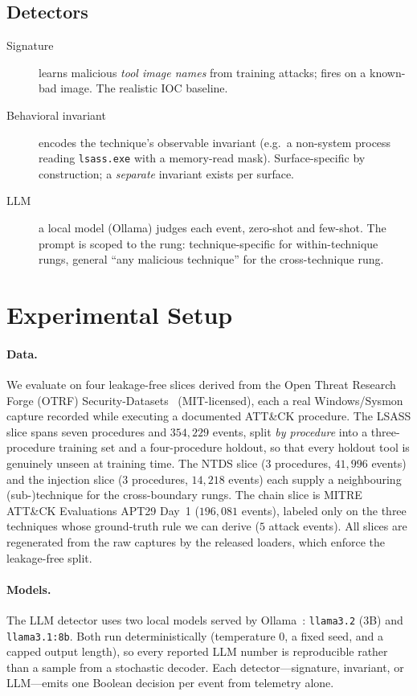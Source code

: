 \documentclass[sigconf,nonacm]{acmart}
\begin{document}
\subsection{Detectors}
\begin{description}
  \item[Signature] learns malicious \emph{tool image names} from training
  attacks; fires on a known-bad image. The realistic IOC baseline.
  \item[Behavioral invariant] encodes the technique's observable invariant
  (e.g.\ a non-system process reading \texttt{lsass.exe} with a memory-read
  mask). Surface-specific by construction; a \emph{separate} invariant exists
  per surface.
  \item[LLM] a local model (Ollama) judges each event, zero-shot and few-shot.
  The prompt is scoped to the rung: technique-specific for within-technique
  rungs, general ``any malicious technique'' for the cross-technique rung.
\end{description}

\section{Experimental Setup}
\label{sec:setup}

\paragraph{Data.}
We evaluate on four leakage-free slices derived from the Open Threat Research
Forge (OTRF) Security-Datasets~\cite{otrf} (MIT-licensed), each a real
Windows/Sysmon capture recorded while executing a documented ATT\&CK procedure.
The LSASS slice spans seven procedures and $354{,}229$ events, split
\emph{by procedure} into a three-procedure training set and a four-procedure
holdout, so that every holdout tool is genuinely unseen at training time. The
NTDS slice ($3$ procedures, $41{,}996$ events) and the injection slice
($3$ procedures, $14{,}218$ events) each supply a neighbouring (sub-)technique
for the cross-boundary rungs. The chain slice is MITRE ATT\&CK Evaluations APT29
Day~1 ($196{,}081$ events), labeled only on the three techniques whose
ground-truth rule we can derive ($5$ attack events). All slices are regenerated
from the raw captures by the released loaders, which enforce the leakage-free
split.

\paragraph{Models.}
The LLM detector uses two local models served by Ollama~\cite{ollama}:
\texttt{llama3.2} (3B) and \texttt{llama3.1:8b}. Both run deterministically
(temperature $0$, a fixed seed, and a capped output length), so every reported
LLM number is reproducible rather than a sample from a stochastic decoder. Each
detector---signature, invariant, or LLM---emits one Boolean decision per event
from telemetry alone.
\end{document}
